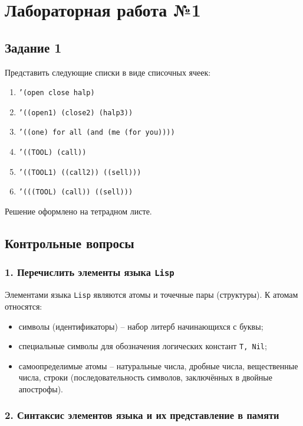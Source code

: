\chapter*{Лабораторная работа №1}

\section*{Задание 1}

Представить следующие списки в виде списочных ячеек:
\begin{enumerate}
	\item {\texttt{'(open close halp)}}
	\item {\texttt{'((open1) (close2) (halp3))}}
	\item {\texttt{'((one) for all (and (me (for you))))}}
	\item {\texttt{'((TOOL) (call))}}
	\item {\texttt{'((TOOL1) ((call2)) ((sell)))}}
	\item {\texttt{'(((TOOL) (call)) ((sell)))}}
\end{enumerate}

Решение оформлено на тетрадном листе.

\section*{Контрольные вопросы}

\subsection*{1. Перечислить элементы языка {\texttt{Lisp}}}

Элементами языка {\texttt{Lisp}} являются атомы и точечные пары (структуры). К атомам относятся:
\begin{itemize}
	\item символы (идентификаторы) -- набор литерб начинающихся с буквы;
	\item специальные символы для обозначения логических констант {\texttt{T,~Nil}};
	\item самоопределимые атомы -- натуральные числа, дробные числа, вещественные числа, строки (последовательность символов, заключённых в двойные апострофы).
\end{itemize}

\subsection*{2. Синтаксис элементов языка и их представление в памяти}

